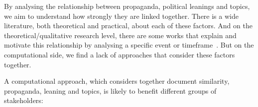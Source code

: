 
By analysing the relationship between propaganda, political leanings and topics, we aim to understand how strongly they are linked together. There is a wide literature, both theoretical and practical, about each of these factors.
And on the theoretical/qualitative research level, there are some works that explain and motivate this relationship by analysing a specific event or timeframe~\citep{pierri2023propaganda,golovchenko2020cross,blumberg1986comparative}.
But on the computational side, we find a lack of approaches that consider these factors together.

A computational approach, which considers together document similarity, propaganda, leaning and topics, is likely to benefit different groups of stakeholders:


